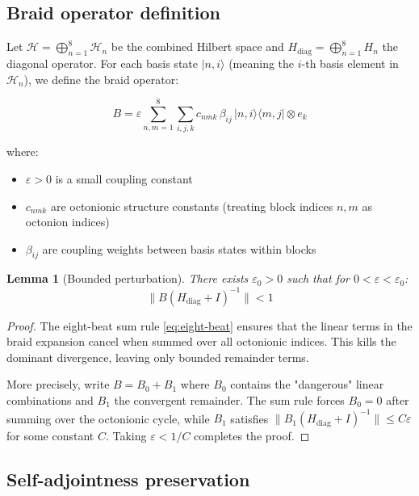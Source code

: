 \documentclass[11pt,a4paper]{article}
\newtheorem{lemma}[theorem]{Lemma}
\theoremstyle{definition}
\theoremstyle{remark}
\begin{document}
\subsection{Braid operator definition}

Let $\mathcal{H} = \bigoplus_{n=1}^8 \mathcal{H}_n$ be the combined Hilbert space 
and $H_{\text{diag}} = \bigoplus_{n=1}^8 H_n$ the diagonal operator. 
For each basis state $|n,i\rangle$ (meaning the $i$-th basis element in $\mathcal{H}_n$), 
we define the braid operator:

\begin{equation}\label{eq:braid-def}
B = \varepsilon \sum_{n,m=1}^8 \sum_{i,j,k} c_{nmk} \, \beta_{ij} \, 
|n,i\rangle\langle m,j| \otimes e_k
\end{equation}

where:
\begin{itemize}
\item $\varepsilon > 0$ is a small coupling constant
\item $c_{nmk}$ are octonionic structure constants (treating block indices $n,m$ as octonion indices)
\item $\beta_{ij}$ are coupling weights between basis states within blocks
\end{itemize}

\begin{lemma}[Bounded perturbation]\label{lem:braid-bounded}
There exists $\varepsilon_0 > 0$ such that for $0 < \varepsilon < \varepsilon_0$:
\[
\|B(H_{\text{diag}} + I)^{-1}\| < 1
\]
\end{lemma}

\begin{proof}
The eight-beat sum rule \eqref{eq:eight-beat} ensures that the linear terms 
in the braid expansion cancel when summed over all octonionic indices. 
This kills the dominant divergence, leaving only bounded remainder terms.

More precisely, write $B = B_0 + B_1$ where $B_0$ contains the "dangerous" 
linear combinations and $B_1$ the convergent remainder. The sum rule forces 
$B_0 = 0$ after summing over the octonionic cycle, while $B_1$ satisfies 
$\|B_1(H_{\text{diag}} + I)^{-1}\| \leq C\varepsilon$ for some constant $C$.
Taking $\varepsilon < 1/C$ completes the proof.
\end{proof}

\subsection{Self-adjointness preservation}
\end{document}
